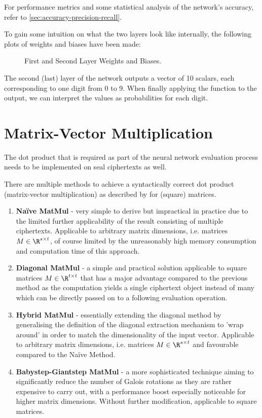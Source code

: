 For performance metrics and some statistical analysis of the network's accuracy, refer to \cref{sec:accuracy-precision-recall}.

To gain some intuition on what the two layers look like internally, the following plots of weights and biases have been made:
\begin{figure}[H]
  \centering
  \caption[Weights and biases of our neural network]{First and Second Layer Weights and Biases.}
  \label{fig:layer-1-and-2}
\end{figure}

The second (last) layer of the network outputs a vector of 10 scalars, each corresponding to one digit from 0 to 9.
When finally applying the  function to the output, we can interpret the values as probabilities for each digit.

\section{Matrix-Vector Multiplication}
\label{sec:matmul}
The dot product that is required as part of the neural network evaluation process needs to be implemented on \gls{seal} ciphertexts as well.

There are multiple methods to achieve a syntactically correct dot product (matrix-vector multiplication) as described by \textcite{2018-gazelle} for (square) matrices.

\begin{enumerate}
  \item \textbf{Naïve MatMul} - very simple to derive but impractical in practice due to the limited further applicability of the result consisting of multiple ciphertexts. Applicable to arbitrary matrix dimensions, i.e. matrices $M \in \R^{s \times t}$, of course limited by the unreasonably high memory consumption and computation time of this approach.
  \item \textbf{Diagonal MatMul} - a simple and practical solution applicable to square matrices $M \in \R^{t \times t}$ that has a major advantage compared to the previous method as the computation yields a single ciphertext object instead of many which can be directly passed on to a following evaluation operation.
  \item \textbf{Hybrid MatMul} - essentially extending the diagonal method by generalising the definition of the diagonal extraction mechanism to 'wrap around' in order to match the dimensionality of the input vector.
        Applicable to arbitrary matrix dimensions, i.e. matrices $M \in \R^{s \times t}$ and favourable compared to the Naïve Method.
  \item \textbf{Babystep-Giantstep MatMul} - a more sophisticated technique aiming to significantly reduce the number of Galois rotations as they are rather expensive to carry out, with a performance boost especially noticeable for higher matrix dimensions.
        Without further modification, applicable to square matrices.
\end{enumerate}

